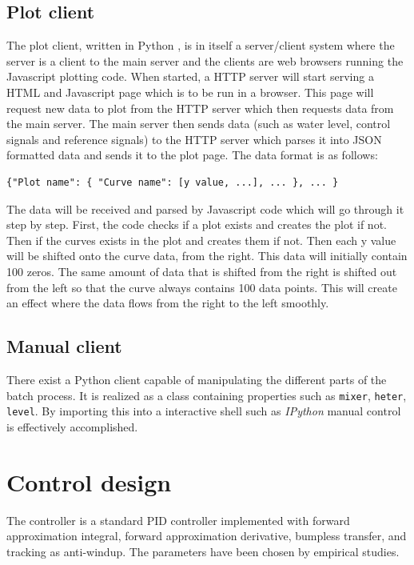\documentclass{article}
\begin{document}
\subsection{Plot client}
The plot client, written in Python \cite{python}, is in itself a server/client
system where the server is a client to the main server and the clients are web
browsers running the Javascript plotting code. When started, a HTTP server will
start serving a HTML and Javascript page which is to be run in a browser. This
page will request new data to plot from the HTTP server which then requests data
from the main server. The main server then sends data (such as water level,
control signals and reference signals) to the HTTP server which parses it into
JSON \cite{json} formatted data and sends it to the plot page. The data format is
as follows:
\begin{verbatim}
{"Plot name": { "Curve name": [y value, ...], ... }, ... }
\end{verbatim}
The data will be received and parsed by Javascript code which will go through it
step by step. First, the code checks if a plot exists and creates the plot if
not. Then if the curves exists in the plot and creates them if not. Then each y
value will be shifted onto the curve data, from the right. This data will
initially contain 100 zeros. The same amount of data that is shifted from the
right is shifted out from the left so that the curve always contains 100
data points. This will create an effect where the data flows from the right to
the left smoothly.


\subsection{Manual client}
There exist a Python client capable of manipulating the different parts
of the batch process. It is realized as a class containing properties
such as \verb+mixer+, \verb+heter+, \verb+level+. By importing this into
a interactive shell such as \emph{IPython} manual control is effectively
accomplished.


\section{Control design}
The controller is a standard PID controller implemented with forward
approximation integral, forward approximation derivative, bumpless transfer,
and tracking as anti-windup. The parameters have been chosen by empirical
studies. 
\end{document}
